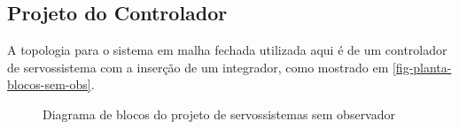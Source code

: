 \documentclass[
	12pt,				%
	article,			%
	openright,			%
	oneside,
	a4paper,			%
	chapter=TITLE,		%
	section=TITLE,		%
	english,			%
	french,				%
	spanish,			%
	brazil,				%
]{abntex2}
\begin{document}
        \subsection{Projeto do Controlador}
        
            A topologia para o sistema em malha fechada utilizada aqui é de um controlador de servossistema com a inserção de um integrador, como mostrado em \autoref{fig-planta-blocos-sem-obs}.
            
            \begin{figure}[htbp]
                \centering
                \caption{Diagrama de blocos do projeto de servossistemas sem observador}
                \label{fig-planta-blocos-sem-obs}
\end{figure}
\end{document}
